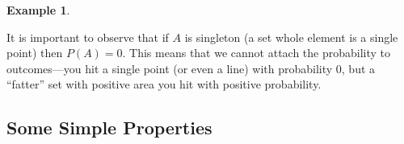 \documentclass[12pt,a4paper]{article}
\theoremstyle{definition}
\newtheorem{example}{Example}[section]
\theoremstyle{definition}
\theoremstyle{definition}
\theoremstyle{definition}
\theoremstyle{remark}
\theoremstyle{definition}
\begin{document}
\begin{example}
\begin{figure}[h!]
	\caption{}
\end{figure} It is important to observe that if $A$ is singleton (a set whole element is a single point) then $P(A)=0$. This means that we cannot attach the probability to outcomes---you hit a single point (or even a line) with probability 0, but a ``fatter'' set with positive area you hit with positive probability.
\end{example}

\newpage
\subsection{Some Simple Properties}
\end{document}
